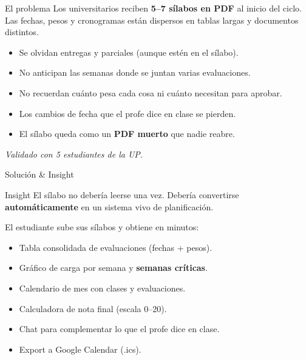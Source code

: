 \documentclass[aspectratio=169]{beamer}
\begin{document}
\begin{frame}{El problema}
  Los universitarios reciben \textbf{5–7 sílabos en PDF} al inicio del ciclo. Las fechas, pesos y cronogramas están dispersos en tablas largas y documentos distintos.
  \vspace{0.3cm}
  \begin{itemize}
    \item Se olvidan entregas y parciales (aunque estén en el sílabo).
    \item No anticipan las semanas donde se juntan varias evaluaciones.
    \item No recuerdan cuánto pesa cada cosa ni cuánto necesitan para aprobar.
    \item Los cambios de fecha que el profe dice en clase se pierden.
    \item El sílabo queda como un \textbf{PDF muerto} que nadie reabre.
  \end{itemize}
  \vspace{0.2cm}
  \footnotesize\textit{Validado con 5 estudiantes de la UP.}
\end{frame}

\begin{frame}{Solución \& Insight}
  \begin{block}{Insight}
    El sílabo no debería leerse una vez. Debería convertirse \textbf{automáticamente} en un sistema vivo de planificación.
  \end{block}
  \vspace{0.2cm}
  El estudiante sube sus sílabos y obtiene en minutos:
  \begin{itemize}
    \item Tabla consolidada de evaluaciones (fechas + pesos).
    \item Gráfico de carga por semana y \textbf{semanas críticas}.
    \item Calendario de mes con clases y evaluaciones.
    \item Calculadora de nota final (escala 0–20).
    \item Chat para complementar lo que el profe dice en clase.
    \item Export a Google Calendar (.ics).
  \end{itemize}
\end{frame}
\end{document}
